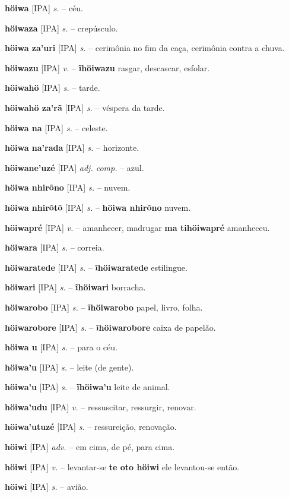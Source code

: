 \textbf{höiwa} [IPA] \textit{s.} -- céu.

\textbf{höiwaza} [IPA] \textit{s.} -- crepúsculo.

\textbf{höiwa za'uri} [IPA] \textit{s.} -- cerimônia no fim da caça, cerimônia contra a chuva.

\textbf{höiwazu} [IPA] \textit{v.} -- \textbf{ĩhöiwazu} rasgar, descascar, esfolar.

\textbf{höiwahö} [IPA] \textit{s.} -- tarde.

\textbf{höiwahö za'rã} [IPA] \textit{s.} -- véspera da tarde.

\textbf{höiwa na} [IPA] \textit{s.} -- celeste.

\textbf{höiwa na'rada} [IPA] \textit{s.} -- horizonte.

\textbf{höiwane'uzé} [IPA] \textit{adj. comp.} -- azul.

\textbf{höiwa nhirõno} [IPA] \textit{s.} -- nuvem.

\textbf{höiwa nhirõtõ} [IPA] \textit{s.} -- \textbf{höiwa nhirõno} nuvem.

\textbf{höiwapré} [IPA] \textit{v.} -- amanhecer, madrugar  \textbf{ma tihöiwapré} amanheceu.

\textbf{höiwara} [IPA] \textit{s.} -- correia.

\textbf{höiwaratede} [IPA] \textit{s.} -- \textbf{ĩhöiwaratede} estilingue.

\textbf{höiwari} [IPA] \textit{s.} -- \textbf{ĩhöiwari} borracha.

\textbf{höiwarobo} [IPA] \textit{s.} -- \textbf{ĩhöiwarobo} papel, livro, folha.

\textbf{höiwarobore} [IPA] \textit{s.} -- \textbf{ĩhöiwarobore} caixa de papelão.

\textbf{höiwa u} [IPA] \textit{s.} -- para o céu.

\textbf{höiwa'u} [IPA] \textit{s.} -- leite (de gente).

\textbf{höiwa'u} [IPA] \textit{s.} -- \textbf{ĩhöiwa'u} leite de animal.

\textbf{höiwa'udu} [IPA] \textit{v.} -- ressuscitar, ressurgir, renovar.

\textbf{höiwa'utuzé} [IPA] \textit{s.} -- ressureição, renovação.

\textbf{höiwi} [IPA] \textit{adv.} -- em cima, de pé, para cima.

\textbf{höiwi} [IPA] \textit{v.} -- levantar-se  \textbf{te oto höiwi} ele levantou-se então.

\textbf{höiwi} [IPA] \textit{s.} -- avião.

